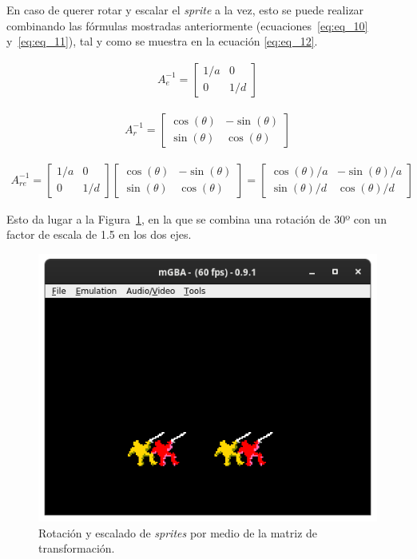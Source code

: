 En caso de querer rotar y escalar el \textit{sprite} a la vez, esto se puede realizar combinando las fórmulas mostradas anteriormente (ecuaciones~\eqref{eq:eq_10} y~\eqref{eq:eq_11}), tal y como se muestra en la ecuación \eqref{eq:eq_12}.

\begin{align}
	A_e^{-1}
	=
	\begin{bmatrix}
		1/a & 0 \\
		0 & 1/d
	\end{bmatrix}
	\label{eq:eq_10}
\end{align}

\begin{align}
	A_r^{-1}
	=
	\begin{bmatrix}
		\cos(\theta) & -\sin(\theta)\\
		\sin(\theta) & \cos(\theta)
	\end{bmatrix}
	\label{eq:eq_11}
\end{align}

\begin{align}
	A_{re}^{-1}
	=
	\begin{bmatrix}
		1/a & 0 \\
		0 & 1/d
	\end{bmatrix}
	\begin{bmatrix}
		\cos(\theta) & -\sin(\theta)\\
		\sin(\theta) & \cos(\theta)
	\end{bmatrix}
	=
	\begin{bmatrix}
		\cos(\theta)/a & -\sin(\theta)/a\\
		\sin(\theta)/d & \cos(\theta)/d
	\end{bmatrix}
	\label{eq:eq_12}
\end{align}

Esto da lugar a la Figura~\ref{fig:scale_and_rot}, en la que se combina una rotación de 30º con un factor de escala de 1.5 en los dos ejes.

\begin{figure}[h]
	\centering
	\includegraphics[width=.55\textwidth]{capitulos/capitulo3/rot_scale_30_1.5.png}
	\caption{Rotación y escalado de \textit{sprites} por medio de la matriz de transformación.}
	\label{fig:scale_and_rot}
\end{figure}
\FloatBarrier{}

